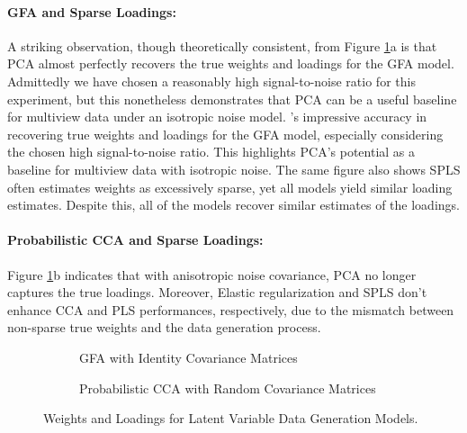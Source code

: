 \paragraph{GFA and Sparse Loadings:} A striking observation, though theoretically consistent, from Figure \ref{fig:latent-variable-weights-loadings}a is that PCA almost perfectly recovers the true weights and loadings for the GFA model.
Admittedly we have chosen a reasonably high signal-to-noise ratio for this experiment, but this nonetheless demonstrates that PCA can be a useful baseline for multiview data under an isotropic noise model.
's impressive accuracy in recovering true weights and loadings for the GFA model, especially considering the chosen high signal-to-noise ratio.
This highlights PCA's potential as a baseline for multiview data with isotropic noise.
The same figure also shows SPLS often estimates weights as excessively sparse, yet all models yield similar loading estimates.
Despite this, all of the models recover similar estimates of the loadings.

\paragraph{Probabilistic CCA and Sparse Loadings:} Figure \ref{fig:latent-variable-weights-loadings}b indicates that with anisotropic noise covariance, PCA no longer captures the true loadings.
Moreover, Elastic regularization and SPLS don't enhance CCA and PLS performances, respectively, due to the mismatch between non-sparse true weights and the data generation process.

\begin{figure}
\centering
\begin{subfigure}{0.49\linewidth}
\centering

\caption{GFA with Identity Covariance Matrices}
\end{subfigure}
%
\begin{subfigure}{0.49\linewidth}
\centering

\caption{Probabilistic CCA with Random Covariance Matrices}
\end{subfigure}
\caption{Weights and Loadings for Latent Variable Data Generation Models.}
\label{fig:latent-variable-weights-loadings}
\end{figure}


